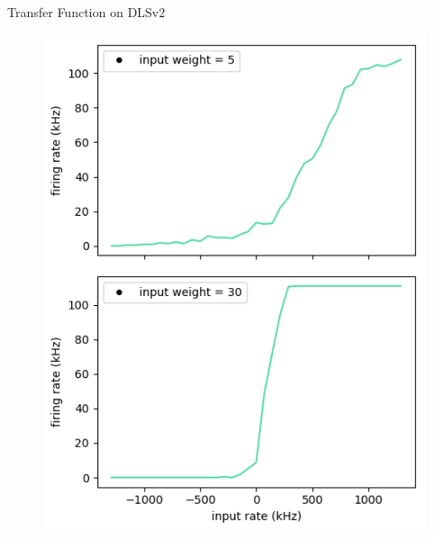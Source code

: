 \documentclass[12pt, aspectratio=169]{beamer}
\begin{document}
\begin{frame}{Transfer Function on DLSv2}
    \centering
            \begin{figure}
                \includegraphics[scale=0.48]{uncalibrated_activation_function_input_single.png}
                \label{membrane_potential}
            \end{figure}
\end{frame}
\end{document}
